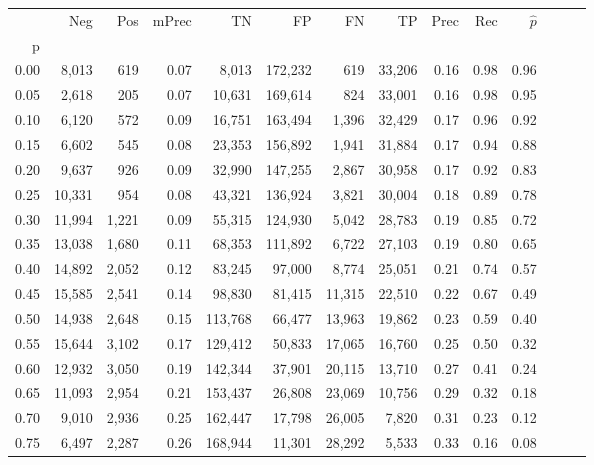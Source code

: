 \begin{tabular}{rrrrrrrrrrrrrr}
\toprule
{} &     Neg &    Pos & mPrec &       TN &       FP &      FN &      TP &  Prec &   Rec & $\hat{p}$ \\
p    &         &        &       &          &          &         &         &       &       &           \\
\midrule
0.00 &   8,013 &    619 &  0.07 &    8,013 &  172,232 &     619 &  33,206 &  0.16 &  0.98 &      0.96 \\
0.05 &   2,618 &    205 &  0.07 &   10,631 &  169,614 &     824 &  33,001 &  0.16 &  0.98 &      0.95 \\
0.10 &   6,120 &    572 &  0.09 &   16,751 &  163,494 &   1,396 &  32,429 &  0.17 &  0.96 &      0.92 \\
0.15 &   6,602 &    545 &  0.08 &   23,353 &  156,892 &   1,941 &  31,884 &  0.17 &  0.94 &      0.88 \\
0.20 &   9,637 &    926 &  0.09 &   32,990 &  147,255 &   2,867 &  30,958 &  0.17 &  0.92 &      0.83 \\
0.25 &  10,331 &    954 &  0.08 &   43,321 &  136,924 &   3,821 &  30,004 &  0.18 &  0.89 &      0.78 \\
0.30 &  11,994 &  1,221 &  0.09 &   55,315 &  124,930 &   5,042 &  28,783 &  0.19 &  0.85 &      0.72 \\
0.35 &  13,038 &  1,680 &  0.11 &   68,353 &  111,892 &   6,722 &  27,103 &  0.19 &  0.80 &      0.65 \\
0.40 &  14,892 &  2,052 &  0.12 &   83,245 &   97,000 &   8,774 &  25,051 &  0.21 &  0.74 &      0.57 \\
0.45 &  15,585 &  2,541 &  0.14 &   98,830 &   81,415 &  11,315 &  22,510 &  0.22 &  0.67 &      0.49 \\
0.50 &  14,938 &  2,648 &  0.15 &  113,768 &   66,477 &  13,963 &  19,862 &  0.23 &  0.59 &      0.40 \\
0.55 &  15,644 &  3,102 &  0.17 &  129,412 &   50,833 &  17,065 &  16,760 &  0.25 &  0.50 &      0.32 \\
0.60 &  12,932 &  3,050 &  0.19 &  142,344 &   37,901 &  20,115 &  13,710 &  0.27 &  0.41 &      0.24 \\
0.65 &  11,093 &  2,954 &  0.21 &  153,437 &   26,808 &  23,069 &  10,756 &  0.29 &  0.32 &      0.18 \\
0.70 &   9,010 &  2,936 &  0.25 &  162,447 &   17,798 &  26,005 &   7,820 &  0.31 &  0.23 &      0.12 \\
0.75 &   6,497 &  2,287 &  0.26 &  168,944 &   11,301 &  28,292 &   5,533 &  0.33 &  0.16 &      0.08 \\

\end{tabular}

